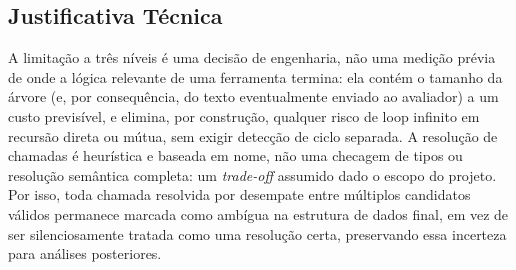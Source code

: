 \subsection*{Justificativa Técnica}
A limitação a três níveis é uma decisão de engenharia, não uma medição
prévia de onde a lógica relevante de uma ferramenta termina: ela contém o
tamanho da árvore (e, por consequência, do texto eventualmente enviado ao
avaliador) a um custo previsível, e elimina, por construção, qualquer
risco de loop infinito em recursão direta ou mútua, sem exigir detecção de
ciclo separada. A resolução de chamadas é heurística e baseada em nome, não
uma checagem de tipos ou resolução semântica completa: um \textit{trade-off}
assumido dado o escopo do projeto. Por isso, toda chamada resolvida por
desempate entre múltiplos candidatos válidos permanece marcada como
ambígua na estrutura de dados final, em vez de ser silenciosamente tratada
como uma resolução certa, preservando essa incerteza para análises
posteriores.
